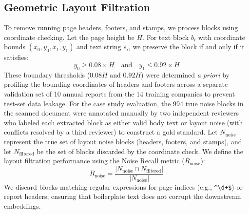 \documentclass[journal]{IEEEtran}
\begin{document}
\subsection{Geometric Layout Filtration}
To remove running page headers, footers, and stamps, we process blocks using coordinate checking. Let the page height be $H$. For text block $b_i$ with coordinate bounds $(x_0, y_0, x_1, y_1)$ and text string $s_i$, we preserve the block if and only if it satisfies:
\begin{equation}
y_0 \ge 0.08 \times H \quad \text{and} \quad y_1 \le 0.92 \times H
\end{equation}
These boundary thresholds ($0.08H$ and $0.92H$) were determined \textit{a priori} by profiling the bounding coordinates of headers and footers across a separate validation set of 10 annual reports from the 14 training companies to prevent test-set data leakage. For the case study evaluation, the 994 true noise blocks in the scanned document were annotated manually by two independent reviewers who labeled each extracted block as either valid body text or layout noise (with conflicts resolved by a third reviewer) to construct a gold standard. Let $N_{\text{noise}}$ represent the true set of layout noise blocks (headers, footers, and stamps), and let $N_{\text{filtered}}$ be the set of blocks discarded by the coordinate check. We define the layout filtration performance using the Noise Recall metric ($R_{\text{noise}}$):
\begin{equation}
R_{\text{noise}} = \frac{|N_{\text{noise}} \cap N_{\text{filtered}}|}{|N_{\text{noise}}|}
\end{equation}
We discard blocks matching regular expressions for page indices (e.g., \verb|^\d+$|) or report headers, ensuring that boilerplate text does not corrupt the downstream embeddings.
\end{document}

